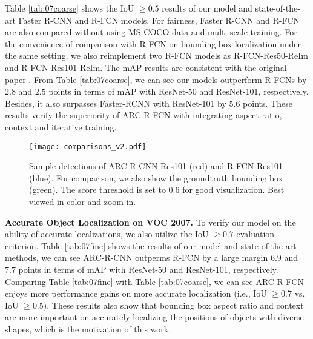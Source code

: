 \documentclass[10pt,twocolumn,letterpaper]{article}
\begin{document}
Table \ref{tab:07coarse} shows the IoU $\ge 0.5$ results of our model and state-of-the-art Faster R-CNN \cite{faster_rcnn} and R-FCN \cite{rfcn} models. For fairness, Faster R-CNN and R-FCN are also compared without using MS COCO data and multi-scale training.
For the convenience of comparison with R-FCN on bounding box localization under the same setting, we also reimplement two R-FCN models as R-FCN-Res50-ReIm and R-FCN-Res101-ReIm. The mAP results are consistent with the original paper \cite{rfcn}.
From Table \ref{tab:07coarse}, we can see our models outperform R-FCNs by $2.8$ and $2.5$ points in terms of mAP with ResNet-50 and ResNet-101, respectively. Besides, it also surpasses Faster-RCNN with ResNet-101 by $5.6$ points. These results verify the superiority of ARC-R-FCN with integrating aspect ratio, context and iterative training.

\begin{table*} 
\begin{center}
\end{center}
\caption{mAP results with IoU $\ge 0.7$ of ARC-R-CNN and state-of-the-art models on PASCAL VOC 2007 test set.}
\label{tab:07fine} 
\vspace{-3mm}
\end{table*}

\begin{figure*}
\centering
{\texttt{[image: comparisons\_v2.pdf]}}
\caption{Sample detections of ARC-R-CNN-Res101 (red) and R-FCN-Res101 \cite{rfcn} (blue). For comparison, we also show the groundtruth bounding box (green). The score threshold is set to $0.6$ for good visualization. Best viewed in color and zoom in. \vspace{-5mm} }
\label{fig:comparisons}
\vspace{-1mm}
\end{figure*} 

\textbf{Accurate Object Localization on VOC 2007.} To verify our model on the ability of accurate localizations, we also utilize the IoU $\ge 0.7$ evaluation criterion.
Table \ref{tab:07fine} shows the results of our model and state-of-the-art methods, we can see ARC-R-CNN outperms R-FCN by a large margin $6.9$ and $7.7$ points in terms of mAP with ResNet-50 and ResNet-101, respectively. 
Comparing Table \ref{tab:07fine} with Table \ref{tab:07coarse}, we can see ARC-R-FCN enjoys more performance gains on more accurate localization (i.e., IoU $\ge 0.7$ vs. IoU $\ge 0.5$).
These results also show that bounding box aspect ratio and context are more important on accurately localizing the positions of objects with diverse shapes, which is the motivation of this work.
\end{document}
